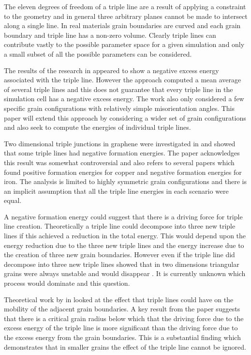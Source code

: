 \documentclass[12pt,a4paper,openany]{report}
\begin{document}
The eleven degrees of freedom of a triple line are a result of applying a constraint to the geometry and in general three arbitrary planes cannot be made to intersect along a single line.  In real materials grain boundaries are curved and each grain boundary and triple line has a non-zero volume. Clearly triple lines can contribute vastly to the possible parameter space for a given simulation and only a small subset of all the possible parameters can be considered.

The results of the research in \cite{Srinivasan1999} appeared to show a negative excess energy associated with the triple line. However the approach computed a mean average of several triple lines and this does not guarantee that every triple line in the simulation cell has a negative excess energy. The work also only considered a few specific grain configurations with relatively simple misorientation angles. This paper will extend this approach by considering a wider set of grain configurations and also seek to compute the energies of individual triple lines.

Two dimensional triple junctions in graphene were  investigated in \citep{Hirvonen2017} and showed that some triple lines had negative formation energies. The paper acknowledges this result was somewhat controversial and also refers to several papers which found positive formation energies for copper and negative formation energies for iron. The analysis is limited to highly symmetric grain configurations and there is an implicit assumption that all the triple line energies in each scenario were equal.

A negative formation energy could suggest that there is a driving force for triple line creation. Theoretically a triple line could decompose into three new triple lines if this achieved a reduction in the total energy. This would depend upon the energy reduction due to the three new triple lines and the energy increase due to the creation of three new grain boundaries. However even if the triple line did decompose into three new triple lines \citeauthor{Shvindlerman2005} showed that in two dimensions triangular grains were always unstable and would disappear \cite{Shvindlerman2005}. It is currently unknown which process would dominate and this question.

Theoretical work by \citeauthor{GOTTSTEIN2010914} in \cite{GOTTSTEIN2010914} looked at the effect that triple lines could have on the mobility of the adjacent grain boundaries. A key result from the paper suggests that there is a critical grain radius below which that the driving force due to the excess energy of the triple line is more significant than the driving force due to the excess energy from the grain boundaries. This is a substantial finding which demonstrates that in smaller grains the effect of the triple line cannot be ignored. 
 
\end{document}
